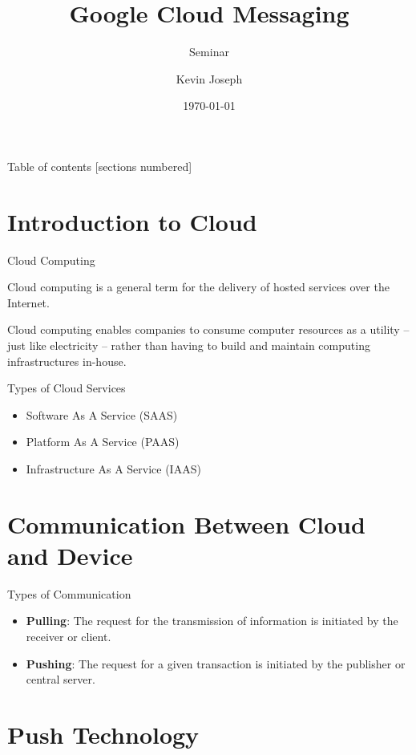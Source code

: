 \documentclass[10pt]{beamer}
\title{Google Cloud Messaging}
\subtitle{Seminar}
\date{\today}
\author{Kevin Joseph}
\institute{College of Engineering, Trivandrum}
\begin{document}
\nocite{*}
\maketitle

\begin{frame}{Table of contents}
  [sections numbered]
  \tableofcontents[hideallsubsections]
\end{frame}

\section{Introduction to Cloud}

\begin{frame}[fragile]{Cloud Computing}

  Cloud computing is a general term for the delivery of hosted services over the Internet. 

  Cloud computing enables companies to consume computer resources as a utility -- just like electricity -- rather than having to build and maintain computing infrastructures in-house. 
\end{frame}
\begin{frame}[fragile]{Types of Cloud Services}
  \begin{itemize}
		\item Software As A Service (SAAS)
		\item Platform As A Service (PAAS)
		\item Infrastructure As A Service (IAAS)
	\end{itemize}
\end{frame}

\section{Communication Between Cloud and Device}

\begin{frame}{Types of Communication}
	\begin{itemize}
		\item \textbf{Pulling}: The request for the transmission of information is initiated by the receiver or client. 
		\item \textbf{Pushing}: The request for a given transaction is initiated by the publisher or central server.
	\end{itemize}
\end{frame}

\section{Push Technology}
\end{document}
